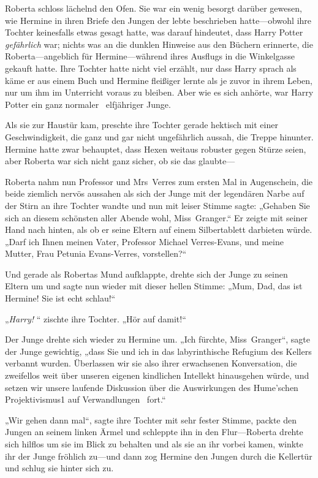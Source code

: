 {Roberta schloss lächelnd den Ofen. Sie war ein wenig besorgt darüber gewesen, wie Hermine in ihren Briefe den Jungen der lebte beschrieben hatte—obwohl ihre Tochter keinesfalls etwas gesagt hatte, was darauf hindeutet, dass Harry Potter \emph{gefährlich} war; nichts was an die dunklen Hinweise aus den Büchern erinnerte, die Roberta—angeblich für Hermine—während ihres Ausflugs in die Winkelgasse gekauft hatte. Ihre Tochter hatte nicht viel erzählt, nur dass Harry sprach als käme er aus einem Buch und Hermine fleißiger lernte als je zuvor in ihrem Leben, nur um ihm im Unterricht voraus zu bleiben. Aber wie es sich anhörte, war Harry Potter ein ganz normaler ~elfjähriger Junge.

Als sie zur Haustür kam, preschte ihre Tochter gerade hektisch mit einer Geschwindigkeit, die ganz und gar nicht ungefährlich aussah, die Treppe hinunter. Hermine hatte zwar behauptet, dass Hexen weitaus robuster gegen Stürze seien, aber Roberta war sich nicht ganz sicher, ob sie das glaubte—

Roberta nahm nun Professor und Mrs~Verres zum ersten Mal in Augenschein, die beide ziemlich nervös aussahen als sich der Junge mit der legendären Narbe auf der Stirn an ihre Tochter wandte und nun mit leiser Stimme sagte: „Gehaben Sie sich an diesem schönsten aller Abende wohl, Miss~Granger.“ Er zeigte mit seiner Hand nach hinten, als ob er seine Eltern auf einem Silbertablett darbieten würde. „Darf ich Ihnen meinen Vater, Professor Michael Verres-Evans, und meine Mutter, Frau Petunia Evans-Verres, vorstellen?“

Und gerade als Robertas Mund aufklappte, drehte sich der Junge zu seinen Eltern um und sagte nun wieder mit dieser hellen Stimme: „Mum, Dad, das ist Hermine! Sie ist echt schlau!“

„\emph{Harry!} “ zischte ihre Tochter. „Hör auf damit!“

Der Junge drehte sich wieder zu Hermine um. „Ich fürchte, Miss~Granger“, sagte der Junge gewichtig, „dass Sie und ich in das labyrinthische Refugium des Kellers verbannt wurden. Überlassen wir sie also ihrer erwachsenen Konversation, die zweifellos weit über unseren eigenen kindlichen Intellekt hinausgehen würde, und setzen wir unsere laufende Diskussion über die Auswirkungen des Hume'schen Projektivismus1 auf Verwandlungen ~fort.“

„Wir gehen dann mal“, sagte ihre Tochter mit sehr fester Stimme, packte den Jungen an seinem linken Ärmel und schleppte ihn in den Flur—Roberta drehte sich hilflos um sie im Blick zu behalten und als sie an ihr vorbei kamen, winkte ihr der Junge fröhlich zu—und dann zog Hermine den Jungen durch die Kellertür und schlug sie hinter sich zu.

}
